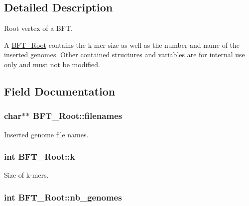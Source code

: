 \subsection{Detailed Description}
Root vertex of a B\+FT. 

A \hyperlink{structBFT__Root}{B\+F\+T\+\_\+\+Root} contains the k-\/mer size as well as the number and name of the inserted genomes. Other contained structures and variables are for internal use only and must not be modified. 

\subsection{Field Documentation}
\subsubsection[{\texorpdfstring{filenames}{filenames}}]{\setlength{\rightskip}{0pt plus 5cm}char$\ast$$\ast$ B\+F\+T\+\_\+\+Root\+::filenames}\hypertarget{structBFT__Root_a8022a504e2c0dd2d800efda892413ce7}{}\label{structBFT__Root_a8022a504e2c0dd2d800efda892413ce7}


Inserted genome file names. 

\subsubsection[{\texorpdfstring{k}{k}}]{\setlength{\rightskip}{0pt plus 5cm}int B\+F\+T\+\_\+\+Root\+::k}\hypertarget{structBFT__Root_ac496349ff4cba68727c5e38d4200848e}{}\label{structBFT__Root_ac496349ff4cba68727c5e38d4200848e}


Size of k-\/mers. 

\subsubsection[{\texorpdfstring{nb\+\_\+genomes}{nb_genomes}}]{\setlength{\rightskip}{0pt plus 5cm}int B\+F\+T\+\_\+\+Root\+::nb\+\_\+genomes}\hypertarget{structBFT__Root_aaa57149b486231b370c0d9287e7e5328}{}\label{structBFT__Root_aaa57149b486231b370c0d9287e7e5328}


